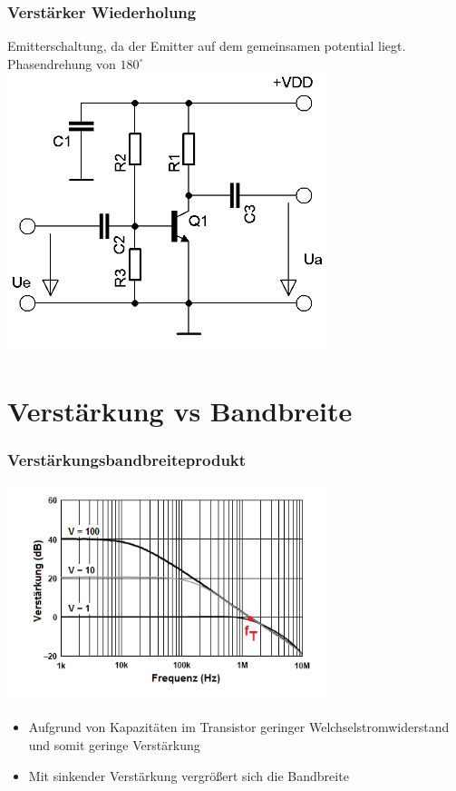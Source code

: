 \begin{frame}
    \frametitle{Verstärker Wiederholung}
    \begin{center}
    \large Emitterschaltung, da der Emitter auf dem gemeinsamen potential liegt.\\
    Phasendrehung von $180^{\circ}$\\
        \includegraphics[width=0.7\textwidth,height=.7\textheight,keepaspectratio]{a07/Transistor_Verstaerker_emetter.png}
	\end{center}
\end{frame}

\section*{Verstärkung vs Bandbreite}

\begin{frame}
    \frametitle{Verstärkungsbandbreiteprodukt}
    \begin{center}
        \includegraphics[width=0.7\textwidth,height=.6\textheight,keepaspectratio]{a07/Closed_loop_gain.png}
	{\tiny \hyperlink{refs}{\cite{wm}}} \\[2em]
	\begin{itemize}
	  \item Aufgrund von Kapazitäten im Transistor geringer Welchselstromwiderstand und somit geringe Verstärkung
	  \item Mit sinkender Verstärkung vergrößert sich die Bandbreite
	\end{itemize}
     \end{center}
\end{frame}

